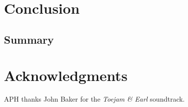 \documentclass[usenatbib,usegraphicx,letterpaper]{mn2e}
\begin{document}
\section{Conclusion}
\label{sec:conclusion}

\subsection{Summary}
\label{subsec:summary}

\section*{Acknowledgments}

APH thanks John Baker for the {\em Toejam \& Earl} soundtrack. 


\end{document}
